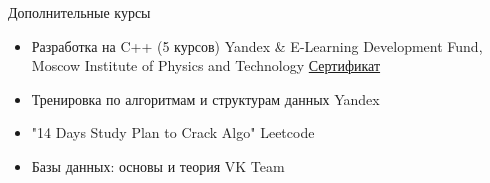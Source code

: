 \documentclass{resume} %
\begin{document}
 
\begin{rSection}{Дополнительные курсы} 
\begin{itemize}
    \item Разработка на C++ (5 курсов) \hfill
    Yandex \& E-Learning Development Fund, Moscow Institute of Physics and Technology \hfill \href{https://drive.google.com/file/d/1d1d4hC7YXxu3HGqzQ9vJUY29GPHpFAra/view?usp=sharing}{Сертификат}
    \item Тренировка по алгоритмам и структурам данных \hfill Yandex
    \item "14 Days Study Plan to Crack Algo" \hfill Leetcode
    \item Базы данных: основы и теория \hfill VK Team
\end{itemize}
 
 
\end{rSection}
 
 
 
 
 
 
\end{document}

